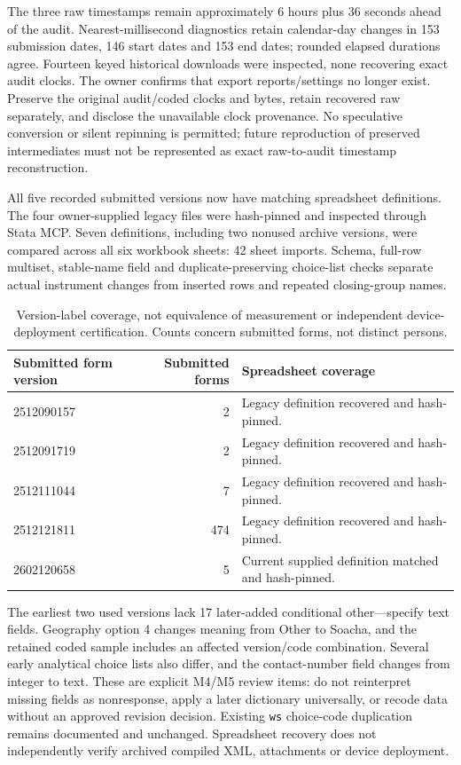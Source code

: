 \documentclass[11pt,a4paper]{article}
\begin{document}
The three raw timestamps remain approximately 6 hours plus 36 seconds ahead of the audit. Nearest-millisecond diagnostics retain calendar-day changes in 153 submission dates, 146 start dates and 153 end dates; rounded elapsed durations agree. Fourteen keyed historical downloads were inspected, none recovering exact audit clocks. The owner confirms that export reports/settings no longer exist. Preserve the original audit/coded clocks and bytes, retain recovered raw separately, and disclose the unavailable clock provenance. No speculative conversion or silent repinning is permitted; future reproduction of preserved intermediates must not be represented as exact raw-to-audit timestamp reconstruction.

All five recorded submitted versions now have matching spreadsheet definitions. The four owner-supplied legacy files were hash-pinned and inspected through Stata MCP. Seven definitions, including two nonused archive versions, were compared across all six workbook sheets: 42 sheet imports. Schema, full-row multiset, stable-name field and duplicate-preserving choice-list checks separate actual instrument changes from inserted rows and repeated closing-group names.

\begin{table}[htbp]
\centering
\begin{tabularx}{\textwidth}{l r X}
\toprule
Submitted form version & Submitted forms & Spreadsheet coverage \\
\midrule
2512090157 & 2 & Legacy definition recovered and hash-pinned. \\
2512091719 & 2 & Legacy definition recovered and hash-pinned. \\
2512111044 & 7 & Legacy definition recovered and hash-pinned. \\
2512121811 & 474 & Legacy definition recovered and hash-pinned. \\
2602120658 & 5 & Current supplied definition matched and hash-pinned. \\
\bottomrule
\end{tabularx}
\caption{Version-label coverage, not equivalence of measurement or independent device-deployment certification. Counts concern submitted forms, not distinct persons.}
\end{table}

The earliest two used versions lack 17 later-added conditional other---specify text fields. Geography option 4 changes meaning from Other to Soacha, and the retained coded sample includes an affected version/code combination. Several early analytical choice lists also differ, and the contact-number field changes from integer to text. These are explicit M4/M5 review items: do not reinterpret missing fields as nonresponse, apply a later dictionary universally, or recode data without an approved revision decision. Existing \texttt{ws} choice-code duplication remains documented and unchanged. Spreadsheet recovery does not independently verify archived compiled XML, attachments or device deployment.
\end{document}
